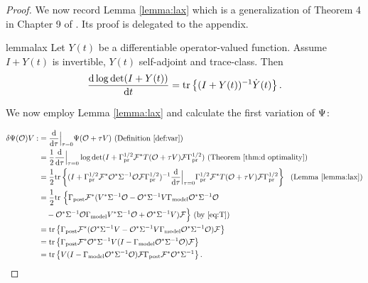 \begin{proof}
  We now record Lemma \ref{lemma:lax} which is a generalization of
  Theorem 4 in Chapter 9 of \cite{Lax07}. Its proof is delegated to
  the appendix.
  \begin{restatable}{lemma}{lax}\label{lemma:lax}
    Let $Y(t)$ be a differentiable operator-valued function. Assume 
    $I+Y(t)$ is invertible, $Y(t)$ self-adjoint and trace-class. Then
    \begin{equation*}
      \frac{\der \log \det (I+Y(t))}{\der t} = \tr{(I+Y(t))^{-1} \dot{Y}(t)}.
    \end{equation*}
  \end{restatable}

  We now employ Lemma \ref{lemma:lax} and calculate the first
  variation of $\Psi$:

  \begin{align*}
      \delta \tar(\obs) V 
      :&= \frac{\der}{\der\tau} \Big |_{\tau=0} \tar(\obs + \tau V) \text{ (Definition \ref{def:var})}\\
      &= \frac12 \frac{\der}{\der \tau} \Big |_{\tau=0} \log \det 
      (I + \prcov^{1/2} \fwd^* T(\obs+\tau V)\fwd \prcov^{1/2} ) \text{ (Theorem \ref{thm:d optimality})} \\
      &= \frac12 \tr{( I + \prcov^{1/2} \fwd^* \obs^* \Sigma^{-1}
        \obs\fwd \prcov^{1/2} )^{-1}
        \frac{\der}{\der \tau} \Big |_{\tau=0}
        \prcov^{1/2} \fwd^* T(\obs+\tau V) \fwd \prcov^{1/2}}\ \text{ (Lemma \ref{lemma:lax})} \\
      &= \frac12 \ttr\Big \{ \postcov \fwd^* (V^* \Sigma^{-1} \obs 
      - \obs^*\Sigma^{-1} V\modcov \obs^* \Sigma^{-1}\obs \\
      &\ \ \ - \obs^* \Sigma^{-1} \obs \modcov V^* \Sigma^{-1}\obs 
      + \obs^* \Sigma^{-1} V ) \fwd \Big \}  \text{ (by \eqref{eq:T})} \\
      &= \tr{\postcov \fwd^* ( \obs^* \Sigma^{-1} V -
      \obs^*\Sigma^{-1} V\modcov \obs^* \Sigma^{-1}\obs ) \fwd} \\
      &= \tr{\postcov \fwd^* \obs^* \Sigma^{-1} V 
      ( I - \modcov \obs^* \Sigma^{-1}\obs ) \fwd} \\
      &= \tr{V ( I - \modcov \obs^* \Sigma^{-1}\obs )
      \fwd \postcov \fwd^* \obs^* \Sigma^{-1}}.
  \end{align*} 
\end{proof}

